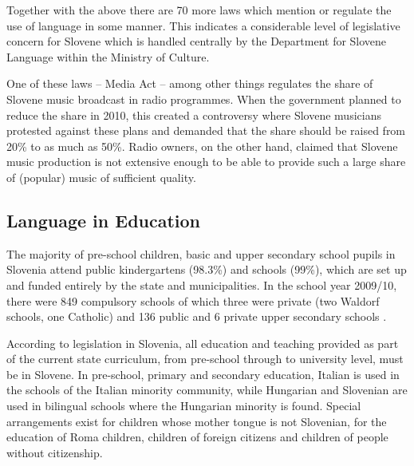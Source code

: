 \begin{multicols}{2}
Together with the above there are 70 more laws which mention or regulate the use of language in some manner. This indicates a considerable level of legislative concern for Slovene which is handled centrally by the Department for Slovene Language within the Ministry of Culture.

One of these laws – Media Act – among other things regulates the share of Slovene music broadcast in radio programmes. When the government planned to reduce the share in 2010, this created a controversy where Slovene musicians protested against these plans and demanded that the share should be raised from 20\% to as much as 50\%. Radio owners, on the other hand, claimed that Slovene music production is not extensive enough to be able to provide such a large share of (popular) music of sufficient quality.


\subsection{Language in Education}

The majority of pre-school children, basic and upper secondary school pupils in Slovenia attend public kindergartens (98.3\%) and schools (99\%), which are set up and funded entirely by the state and municipalities. In the school year 2009/10, there were 849 compulsory schools of which three were private (two Waldorf schools, one Catholic) and 136 public and 6 private upper secondary schools \cite{Eurydice1}.


According to legislation in Slovenia, all education and teaching provided as part of the current state curriculum, from pre-school through to university level, must be in Slovene. In pre-school, primary and secondary education, Italian is used in the schools of the Italian minority community, while Hungarian and Slovenian are used in bilingual schools where the Hungarian minority is found. Special arrangements exist for children whose mother tongue is not Slovenian, for the education of Roma children, children of foreign citizens and children of people without citizenship.\vspace*{-0.09 cm}


\end{multicols}
